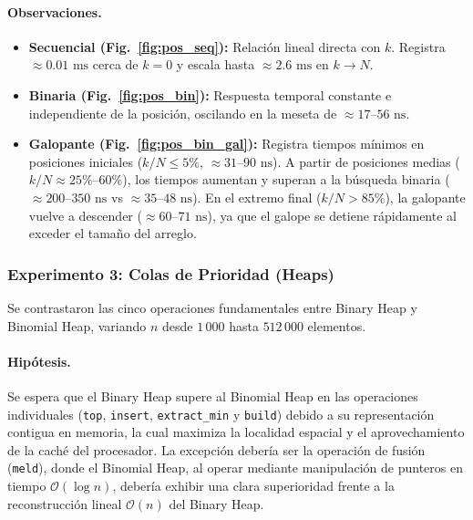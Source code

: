 \documentclass[11pt,letterpaper]{article}
\begin{document}
\paragraph{Observaciones.}
\begin{itemize}
    \item \textbf{Secuencial (Fig.~\ref{fig:pos_seq}):} Relación lineal directa con $k$. Registra $\approx 0.01\text{ ms}$ cerca de $k = 0$ y escala hasta $\approx 2.6\text{ ms}$ en $k \to N$.
    \item \textbf{Binaria (Fig.~\ref{fig:pos_bin}):} Respuesta temporal constante e independiente de la posición, oscilando en la meseta de $\approx 17\text{--}56\text{ ns}$.
    \item \textbf{Galopante (Fig.~\ref{fig:pos_bin_gal}):} Registra tiempos mínimos en posiciones iniciales ($k/N \le 5\%$, $\approx 31\text{--}90\text{ ns}$). A partir de posiciones medias ($k/N \approx 25\%\text{--}60\%$), los tiempos aumentan y superan a la búsqueda binaria ($\approx 200\text{--}350\text{ ns}$ vs $\approx 35\text{--}48\text{ ns}$). En el extremo final ($k/N > 85\%$), la galopante vuelve a descender ($\approx 60\text{--}71\text{ ns}$), ya que el galope se detiene rápidamente al exceder el tamaño del arreglo.
\end{itemize}

\newpage

\subsubsection{Experimento 3: Colas de Prioridad (Heaps)}

Se contrastaron las cinco operaciones fundamentales entre Binary Heap y Binomial Heap, variando $n$ desde $1\,000$ hasta $512\,000$ elementos.

\paragraph{Hipótesis.}
Se espera que el Binary Heap supere al Binomial Heap en las operaciones individuales (\texttt{top}, \texttt{insert}, \texttt{extract\_min} y \texttt{build}) debido a su representación contigua en memoria, la cual maximiza la localidad espacial y el aprovechamiento de la caché del procesador. La excepción debería ser la operación de fusión (\texttt{meld}), donde el Binomial Heap, al operar mediante manipulación de punteros en tiempo $\mathcal{O}(\log n)$, debería exhibir una clara superioridad frente a la reconstrucción lineal $\mathcal{O}(n)$ del Binary Heap.
\end{document}
